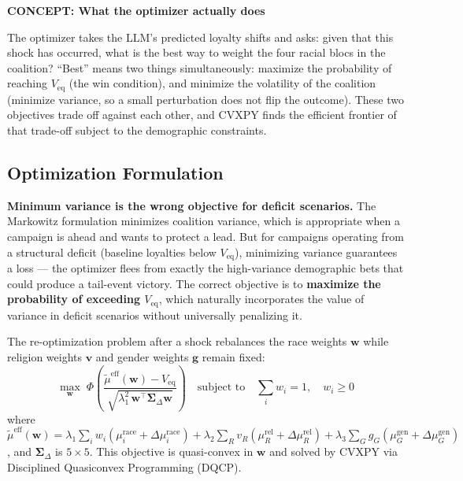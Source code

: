\documentclass[11pt]{article}
\newcommand{\concept}[2]{%
  \begin{mdframed}[style=conceptbox]
  {\small\bfseries\color{bluefg}CONCEPT: #1}\par\smallskip #2
  \end{mdframed}}
\newcommand{\veq}{V_{\mathrm{eq}}}
\newcommand{\boldSigma}{\boldsymbol{\Sigma}}
\begin{document}
\concept{What the optimizer actually does}{
The optimizer takes the LLM's predicted loyalty shifts and asks: given that this
shock has occurred, what is the best way to weight the four racial blocs in the
coalition? ``Best'' means two things simultaneously: maximize the probability of
reaching $\veq$ (the win condition), and minimize the volatility of the coalition
(minimize variance, so a small perturbation does not flip the outcome). These two
objectives trade off against each other, and CVXPY finds the efficient frontier
of that trade-off subject to the demographic constraints.
}

\subsection*{Optimization Formulation}

\begin{mdframed}[style=warnbox]
\textbf{Minimum variance is the wrong objective for deficit scenarios.}
The Markowitz formulation minimizes coalition variance, which is appropriate
when a campaign is ahead and wants to protect a lead. But for campaigns
operating from a structural deficit (baseline loyalties below $\veq$),
minimizing variance guarantees a loss --- the optimizer flees from exactly
the high-variance demographic bets that could produce a tail-event victory.
The correct objective is to \textbf{maximize the probability of exceeding
$\veq$}, which naturally incorporates the value of variance in deficit scenarios
without universally penalizing it.
\end{mdframed}

The re-optimization problem after a shock rebalances the race weights $\mathbf{w}$
while religion weights $\mathbf{v}$ and gender weights $\mathbf{g}$ remain fixed:
\[
  \max_{\mathbf{w}} \; \Phi\!\left(
  \frac{\tilde{\mu}^{\text{eff}}(\mathbf{w}) - \veq}
  {\sqrt{\lambda_1^2\,\mathbf{w}^\top \boldSigma_{\Delta} \mathbf{w}}}
  \right)
  \quad \text{subject to} \quad
  \sum_{i} w_i = 1, \quad w_i \geq 0
\]
where $\tilde{\mu}^{\text{eff}}(\mathbf{w}) = \lambda_1 \sum_i w_i(\mu_i^{\text{race}}
+ \Delta\mu_i^{\text{race}}) + \lambda_2 \sum_R v_R(\mu_R^{\text{rel}}
+ \Delta\mu_R^{\text{rel}}) + \lambda_3 \sum_G g_G(\mu_G^{\text{gen}}
+ \Delta\mu_G^{\text{gen}})$, and $\boldSigma_\Delta$ is $5 \times 5$.
This objective is quasi-convex in $\mathbf{w}$ and solved by CVXPY via
Disciplined Quasiconvex Programming (DQCP).
\end{document}
